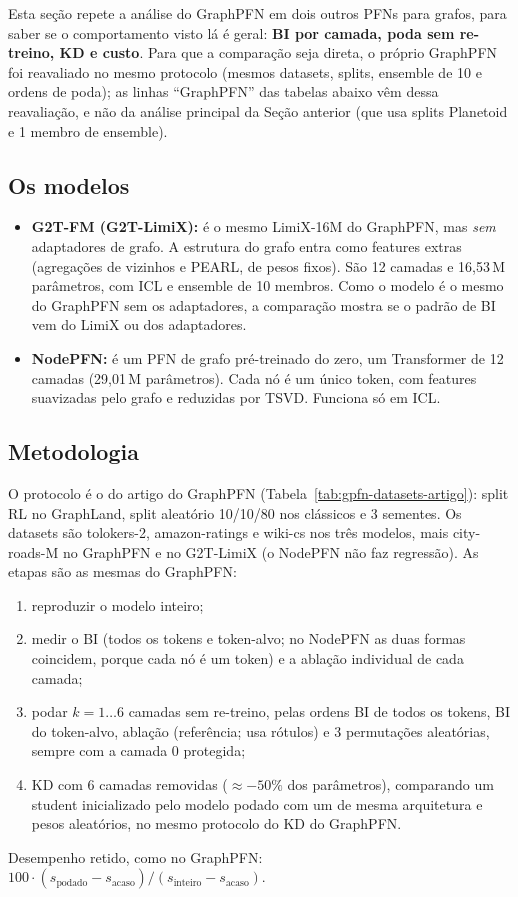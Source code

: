 \documentclass[12pt,a4paper]{article}
\begin{document}
Esta seção repete a análise do GraphPFN em dois outros PFNs para grafos, para saber se o comportamento visto lá é geral: \textbf{BI por camada, poda sem re-treino, KD e custo}. Para que a comparação seja direta, o próprio GraphPFN foi reavaliado no mesmo protocolo (mesmos datasets, splits, ensemble de 10 e ordens de poda); as linhas ``GraphPFN'' das tabelas abaixo vêm dessa reavaliação, e não da análise principal da Seção anterior (que usa splits Planetoid e 1 membro de ensemble).

\subsection{Os modelos}

\begin{itemize}
  \item \textbf{G2T-FM (G2T-LimiX):} é o mesmo LimiX-16M do GraphPFN, mas \emph{sem} adaptadores de grafo. A estrutura do grafo entra como features extras (agregações de vizinhos e PEARL, de pesos fixos). São 12 camadas e 16,53\,M parâmetros, com ICL e ensemble de 10 membros. Como o modelo é o mesmo do GraphPFN sem os adaptadores, a comparação mostra se o padrão de BI vem do LimiX ou dos adaptadores.
  \item \textbf{NodePFN:} é um PFN de grafo pré-treinado do zero, um Transformer de 12 camadas (29,01\,M parâmetros). Cada nó é um único token, com features suavizadas pelo grafo e reduzidas por TSVD. Funciona só em ICL.
\end{itemize}

\subsection{Metodologia}

O protocolo é o do artigo do GraphPFN (Tabela~\ref{tab:gpfn-datasets-artigo}): split RL no GraphLand, split aleatório 10/10/80 nos clássicos e 3 sementes. Os datasets são tolokers-2, amazon-ratings e wiki-cs nos três modelos, mais city-roads-M no GraphPFN e no G2T-LimiX (o NodePFN não faz regressão). As etapas são as mesmas do GraphPFN:
\begin{enumerate}
  \item reproduzir o modelo inteiro;
  \item medir o BI (todos os tokens e token-alvo; no NodePFN as duas formas coincidem, porque cada nó é um token) e a ablação individual de cada camada;
  \item podar $k=1\ldots6$ camadas sem re-treino, pelas ordens BI de todos os tokens, BI do token-alvo, ablação (referência; usa rótulos) e 3 permutações aleatórias, sempre com a camada 0 protegida;
  \item KD com 6 camadas removidas ($\approx-50\%$ dos parâmetros), comparando um student inicializado pelo modelo podado com um de mesma arquitetura e pesos aleatórios, no mesmo protocolo do KD do GraphPFN.
\end{enumerate}
Desempenho retido, como no GraphPFN: $100\cdot(s_{\text{podado}}-s_{\text{acaso}})/(s_{\text{inteiro}}-s_{\text{acaso}})$.
\end{document}
